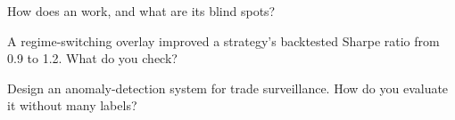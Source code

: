 \begin{interviewq}\label{iq:ml:clustering-regimes-and-anomaly-detection:4}
How does an  work, and what are its blind spots?
\end{interviewq}

\begin{interviewq}\label{iq:ml:clustering-regimes-and-anomaly-detection:5}
A regime-switching overlay improved a strategy's backtested Sharpe ratio from 0.9 to 1.2. What do you check?
\end{interviewq}

\begin{interviewq}\label{iq:ml:clustering-regimes-and-anomaly-detection:6}
Design an anomaly-detection system for trade surveillance. How do you evaluate it without many labels?
\end{interviewq}
